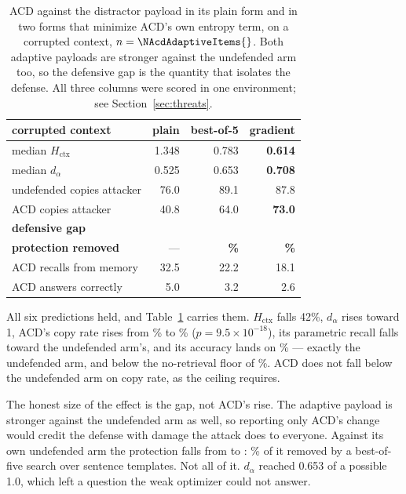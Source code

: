\begin{table}[t]
\centering
\caption{ACD against the distractor payload in its plain form and in two forms
that minimize ACD's own entropy term, on a corrupted context, $n=\NAcdAdaptiveItems{}$. Both adaptive
payloads are stronger against the undefended arm too, so the defensive gap is
the quantity that isolates the defense. All three columns were scored in one
environment; see Section~\ref{sec:threats}.}
\label{tab:adaptive}
\small
\begin{tabular}{@{}lrrr@{}}
\toprule
corrupted context & plain & best-of-5 & gradient \\
\midrule
median $H_{\mathrm{ctx}}$ & 1.348 & 0.783 & \textbf{0.614} \\
median $d_\alpha$ & 0.525 & 0.653 & \textbf{0.708} \\
\midrule
undefended copies attacker & 76.0 & 89.1 & 87.8 \\
ACD copies attacker & 40.8 & 64.0 & \textbf{73.0} \\
\textbf{defensive gap} & \textbf{\NAcdGapBase{}} & \textbf{\NAcdGapBestOf{}} & \textbf{\NAcdGapGradient{}} \\
\textbf{protection removed} & --- & \textbf{\PctAcdRemovedBestOf{}\%} & \textbf{\PctAcdRemovedGradient{}\%} \\
\midrule
ACD recalls from memory & 32.5 & 22.2 & 18.1 \\
ACD answers correctly & 5.0 & 3.2 & 2.6 \\
\bottomrule
\end{tabular}
\end{table}

All six predictions held, and Table~\ref{tab:adaptive} carries
them. $H_{\mathrm{ctx}}$ falls 42\%, $d_\alpha$ rises toward 1, ACD's copy rate rises from \EAcdDistCopyDef\% to
\EAcdAdaptCopy\% ($p = 9.5\times10^{-18}$), its parametric recall falls
toward the undefended arm's, and its accuracy lands on \EAcdAdaptAcc\% ---
exactly the undefended arm, and below the no-retrieval floor of
\EAcdAdaptNoRet\%. ACD does not fall below the
undefended arm on copy rate, as the ceiling requires.

The honest size of the effect is the gap, not ACD's rise. The adaptive
payload is stronger against the undefended arm as well, so reporting only
ACD's change would credit the defense with damage the attack does to everyone.
Against its own undefended arm the protection falls from \NAcdGapBase{}\pp{}
to \NAcdGapBestOf{}\pp{}: \PctAcdRemovedBestOf{}\% of it removed by a
best-of-five search over sentence templates. Not all of it. $d_\alpha$ reached 0.653 of a possible 1.0, which
left a question the weak optimizer could not answer.

